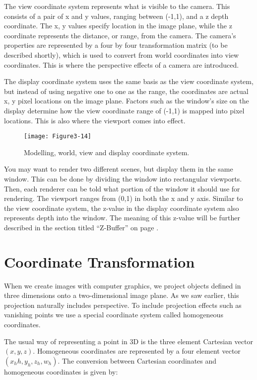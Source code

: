 The view coordinate system represents what is visible to the camera. This consists of a pair of x and y values, ranging between (-1,1), and a z depth coordinate. The x, y values specify location in the image plane, while the z coordinate represents the distance, or range, from the camera. The camera’s properties are represented by a four by four transformation matrix (to be described shortly), which is used to convert from world coordinates into view coordinates. This is where the perspective effects of a camera are introduced.

The display coordinate system uses the same basis as the view coordinate system, but instead of using negative one to one as the range, the coordinates are actual x, y pixel locations on the image plane. Factors such as the window’s size on the display determine how the view coordinate range of (-1,1) is mapped into pixel locations. This is also where the viewport comes into effect.

\begin{figure}[!htb]
  \centering
  \texttt{[image: Figure3-14]}\\
  \caption{ Modelling, world, view and display coordinate system.}\label{fig:Figure3-14}
\end{figure}

You may want to render two different scenes, but display them in the same window. This can be done by dividing the window into rectangular viewports. Then, each renderer can be told what portion of the window it should use for rendering. The viewport ranges from (0,1) in both the x and y axis. Similar to the view coordinate system, the z-value in the display coordinate system also represents depth into the window. The meaning of this z-value will be further described in the section titled “Z-Buffer” on page \pageref{Z-Buffer}.


\section{Coordinate Transformation}

When we create images with computer graphics, we project objects defined in three dimensions onto a two-dimensional image plane. As we saw earlier, this projection naturally includes perspective. To include projection effects such as vanishing points we use a special coordinate system called homogeneous coordinates.

The usual way of representing a point in 3D is the three element Cartesian vector $(x, y, z)$. Homogeneous coordinates are represented by a four element vector $( x_hh, y_h, z_h, w_h )$. The conversion between Cartesian coordinates and homogeneous coordinates is given by:

